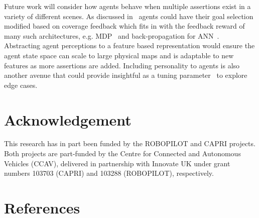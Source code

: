 \documentclass[letterpaper, 10 pt, journal, twoside]{IEEEtran}
\begin{document}
%
Future work will consider how agents behave when multiple assertions %
exist in a variety of different scenes. %
As discussed in~\cite{Eder2007} agents could have their goal selection modified based on coverage feedback %
which fits in with the feedback reward of many such architectures, e.g. MDP~\cite{littman1994markov} and back-propagation for ANN~\cite{foerster2016learning}. %
%
Abstracting agent perceptions to a feature based representation would ensure the agent state space can scale to large physical maps and is adaptable to new features as more assertions are added. %
Including personality to agents is also another avenue that could provide insightful as a tuning parameter~\cite{Zoumpoulaki2010} to explore edge cases. %



\section*{Acknowledgement}
This research has in part been funded by the ROBOPILOT and CAPRI projects. Both
projects are part-funded by the Centre for Connected and Autonomous
Vehicles (CCAV), delivered in partnership with Innovate UK under grant numbers
103703 (CAPRI) and 103288 (ROBOPILOT), respectively.


\balance
\section*{References}
\printbibliography[heading=none]
\end{document}
